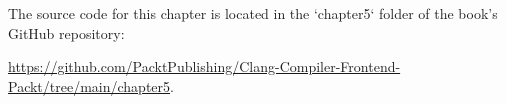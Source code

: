 \begin{markdown}
The source code for this chapter is located in the `chapter5` folder of the book's GitHub repository:
\end{markdown}

\url{https://github.com/PacktPublishing/Clang-Compiler-Frontend-Packt/tree/main/chapter5}.

